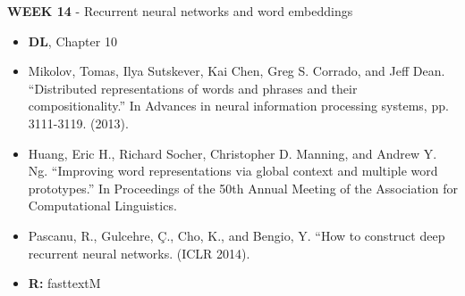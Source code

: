 \documentclass[12pt]{article}
\begin{document}
\textbf{WEEK 14} - Recurrent neural networks and word embeddings

\begin{itemize}\setlength\itemsep{0em}
\item \textbf{DL}, Chapter 10
\item Mikolov, Tomas, Ilya Sutskever, Kai Chen, Greg S. Corrado, and
Jeff Dean. ``Distributed representations of words and phrases and their
compositionality.'' In Advances in neural information processing systems,
pp. 3111-3119. (2013).
\item Huang, Eric H., Richard Socher, Christopher D. Manning, and
Andrew Y. Ng. ``Improving word representations via global context and
multiple word prototypes.'' In Proceedings of the 50th Annual Meeting
of the Association for Computational Linguistics.
\item Pascanu, R., Gulcehre, Ç., Cho, K., and Bengio, Y. ``How to construct
deep recurrent neural networks. (ICLR 2014).
\item \textbf{R:} fasttextM
\end{itemize}
\end{document}
